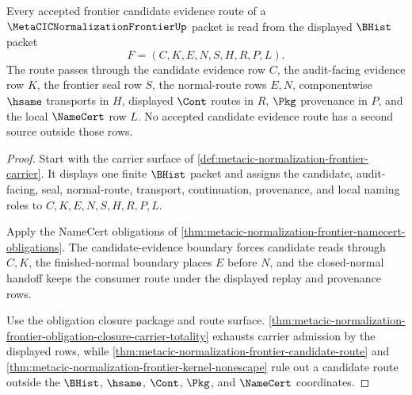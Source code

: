 \begin{theorem}
\label{thm:metacic-normalization-frontier-candidate-evidence-totality}
Every accepted frontier candidate evidence route of a $\MetaCICNormalizationFrontierUp$ packet is read from the displayed $\BHist$ packet
$$
F=(C,K,E,N,S,H,R,P,L).
$$
The route passes through the candidate evidence row $C$, the audit-facing evidence row $K$, the frontier seal row $S$, the normal-route rows $E,N$, componentwise $\hsame$ transports in $H$, displayed $\Cont$ routes in $R$, $\Pkg$ provenance in $P$, and the local $\NameCert$ row $L$. No accepted candidate evidence route has a second source outside those rows.
\end{theorem}
\begin{proof}
Start with the carrier surface of \autoref{def:metacic-normalization-frontier-carrier}. It displays one finite $\BHist$ packet and assigns the candidate, audit-facing, seal, normal-route, transport, continuation, provenance, and local naming roles to $C,K,E,N,S,H,R,P,L$.

Apply the NameCert obligations of \autoref{thm:metacic-normalization-frontier-namecert-obligations}. The candidate-evidence boundary forces candidate reads through $C,K$, the finished-normal boundary places $E$ before $N$, and the closed-normal handoff keeps the consumer route under the displayed replay and provenance rows.

Use the obligation closure package and route surface. \autoref{thm:metacic-normalization-frontier-obligation-closure-carrier-totality} exhausts carrier admission by the displayed rows, while \autoref{thm:metacic-normalization-frontier-candidate-route} and \autoref{thm:metacic-normalization-frontier-kernel-nonescape} rule out a candidate route outside the $\BHist$, $\hsame$, $\Cont$, $\Pkg$, and $\NameCert$ coordinates.
\end{proof}

